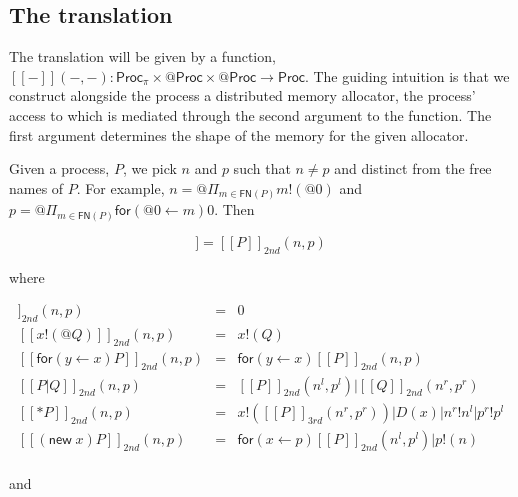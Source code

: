 \documentclass{llncs}
\makeatletter
\newcommand{\ldb}{[\![}
\newcommand{\rdb}{]\!]}
\newcommand{\lliftb}{\langle\!|}
\newcommand{\rliftb}{|\!\rangle}
\newcommand{\id}[1]{\texttt{#1}}
\newcommand{\pzero}{\mathbin{0}}
\newcommand{\freenames}[1]{\mathbin{\mathsf{FN}(#1)}}
\newcommand{\binpar}[2]{#1 | #2}
\newcommand{\outputp}[2]{#1!(#2)}
\newcommand{\lift}[2]{#1 \lliftb #2 \rliftb}
\newcommand{\quotep}[1]{\mathsf{@}#1}
\newcommand{\meaningof}[1]{\ldb #1 \rdb}
\newcommand{\Proc}{\mathsf{Proc}}
\newcommand{\QProc}{\quotep{\mathsf{Proc}}}
\newcommand{\red}{\rightarrow}
\makeatother
\begin{document}
\subsection{The translation}

The translation will be given by a function, $\meaningof{-}( -, - ) :
\Proc_{\pi} \times \QProc \times \QProc \red \Proc$. The guiding
intuition is that we construct alongside the process a distributed memory
allocator, the process' access to which is mediated through the second argument
to the function. The first argument determines the shape of the memory
for the given allocator.

Given a process, $P$, we pick $n$ and $p$ such that $n \neq p$ and
distinct from the free names of $P$. For example, $n = \quotep{\Pi_{m
\in \freenames{P}}\outputp{m}{\quotep{\pzero}}}$ and $p =
\quotep{\Pi_{m \in
\freenames{P}}\mathsf{for}({\quotep{\pzero}} \leftarrow {m}){\pzero}}$. Then

\begin{equation*}
	\meaningof{P} = \meaningof{P}_{2nd}( n, p )
\end{equation*}

where

\begin{eqnarray*}
   	\meaningof{\pzero}_{2nd} (n,p) & = & \pzero \\
   	\meaningof{x!(@Q)}_{2nd} (n,p) & = & x!(Q) \\
   	\meaningof{\mathsf{for}( y \leftarrow x) P}_{2nd} (n,p) 
   		& = & 
 		\mathsf{for}( y \leftarrow x ) \meaningof{P}_{2nd} (n,p) \\
   	\meaningof{P | Q}_{2nd} (n,p) 
   		& = & 
 		\meaningof{P}_{2nd} (n^{l},p^{l}) | \meaningof{Q}_{2nd} (n^{r},p^{r}) \\
   	\meaningof{\mathsf{*} P}_{2nd} (n,p)
   		& = & x!(\meaningof{P}_{3rd}( n^{r}, p^{r} ))|D(x)|n^{r}!n^{l}|p^{r}!p^{l} \\
   	\meaningof{(\mathsf{new} \; x) P}_{2nd} (n,p) 
   		& = & 
 		\mathsf{for}(x \leftarrow p)\meaningof{P}_{2nd} ( n^{l}, p^{l} )|p!(n) \\
\end{eqnarray*}

and
\end{document}
